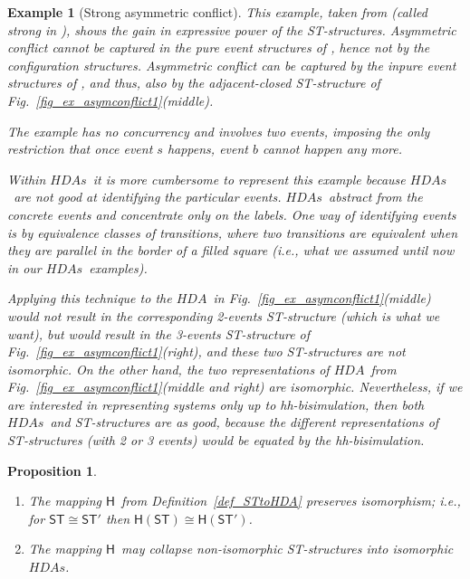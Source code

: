 \documentclass[submission,copyright,creativecommons]{eptcs}
\newtheorem{proposition}[theorem]{Proposition}
\newtheorem{example}[theorem]{Example}
\newcommand\HDA{\ensuremath{\mathit{HDA}}}
\newcommand\HDAs{\ensuremath{\mathit{HDAs}}}
\newcommand\ST{\ensuremath{\mathsf{ST}}}
\newcommand\isomorphic{\ensuremath{\cong}}
\newcommand\stintoh{\ensuremath{\mathsf{H}}}
\begin{document}
\begin{example}[Strong asymmetric conflict]\label{example_asym_confl}
This example, taken from \cite[Ex.3]{GlabbeekP09configStruct} (called \textit{strong} in \cite[p.22]{Pratt03trans_cancel}), shows the gain in expressive power of the ST-structures. Asymmetric conflict cannot be captured in the \emph{pure event structures} of \cite[Def.1.5]{GlabbeekP09configStruct}, hence not by the configuration structures. Asymmetric conflict can be captured by the inpure event structures of \cite{GlabbeekP09configStruct}, and thus, also by the adjacent-closed ST-structure of Fig.~\ref{fig_ex_asymconflict1}(middle).

The example has no concurrency and involves two events, imposing the only restriction that once event $s$ happens, event $b$ cannot happen any more.

Within \HDAs\ it is more cumbersome to represent this example because \HDAs\ are not good at identifying the particular events. \HDAs\ abstract from the concrete events and concentrate only on the labels. 
One way of identifying events is by equivalence classes of transitions, where two transitions are equivalent when they are parallel in the border of a filled square (i.e., what we assumed until now in our \HDAs\ examples).


Applying this technique to the \HDA\ in Fig.~\ref{fig_ex_asymconflict1}(middle) would not result in the corresponding 2-events ST-structure (which is what we want), but would result in the 3-events ST-structure of Fig.~\ref{fig_ex_asymconflict1}(right), and these two ST-structures are not isomorphic.
On the other hand, the two representations of \HDA\ from Fig.~\ref{fig_ex_asymconflict1}(middle and right) are isomorphic. 
Nevertheless, if we are interested in representing systems only up to hh-bisimulation, then both \HDAs\ and ST-structures are as good, because the different representations of ST-structures (with 2 or 3 events) would be equated by the hh-bisimulation.
\end{example}



\begin{proposition}\label{prop_stintoh_iso}
\ 

\begin{enumerate}
\item\label{prop_stintoh_iso_1} The mapping \stintoh\ from Definition~\ref{def_STtoHDA} preserves isomorphism; i.e., for $\ST\isomorphic\ST'$ then $\stintoh(\ST)\isomorphic\stintoh(\ST')$.

\item\label{prop_stintoh_iso_collapse} The mapping \stintoh\ may collapse non-isomorphic ST-structures into isomorphic \HDAs.
\end{enumerate}
\end{proposition}
\end{document}
